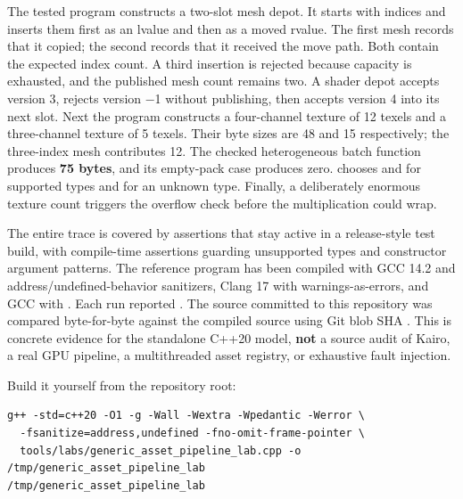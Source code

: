 \hypertarget{01-foundations-i-ch005-one-complete-trace-and-a-reconstruction-challenge}{}

The tested program constructs a two-slot mesh depot. It starts with indices  and inserts them first as an lvalue and then as a moved rvalue. The first mesh records that it copied; the second records that it received the move path. Both contain the expected index count. A third insertion is rejected because capacity is exhausted, and the published mesh count remains two. A shader depot accepts version 3, rejects version −1 without publishing, then accepts version 4 into its next slot. Next the program constructs a four-channel texture of 12 texels and a three-channel texture of 5 texels. Their byte sizes are 48 and 15 respectively; the three-index mesh contributes 12. The checked heterogeneous batch function produces \textbf{75 bytes}, and its empty-pack case produces zero.  chooses  and  for supported types and  for an unknown type. Finally, a deliberately enormous texture count triggers the overflow check before the multiplication could wrap.

The entire trace is covered by assertions that stay active in a release-style test build, with compile-time assertions guarding unsupported types and constructor argument patterns. The reference program has been compiled with GCC 14.2 and address/undefined-behavior sanitizers, Clang 17 with warnings-as-errors, and GCC with . Each run reported . The source committed to this repository was compared byte-for-byte against the compiled source using Git blob SHA . This is concrete evidence for the standalone C++20 model, \textbf{not} a source audit of Kairo, a real GPU pipeline, a multithreaded asset registry, or exhaustive fault injection.

Build it yourself from the repository root:

\begin{verbatim}
g++ -std=c++20 -O1 -g -Wall -Wextra -Wpedantic -Werror \
  -fsanitize=address,undefined -fno-omit-frame-pointer \
  tools/labs/generic_asset_pipeline_lab.cpp -o /tmp/generic_asset_pipeline_lab
/tmp/generic_asset_pipeline_lab
\end{verbatim}

